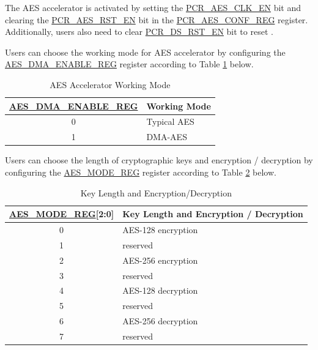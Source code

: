 \documentclass[main\_\_EN.tex]{subfiles}
\begin{document}
The AES accelerator is activated by setting the \hyperref[fielddesc:PCRAESCLKEN]{PCR\_AES\_CLK\_EN} bit and clearing the \hyperref[fielddesc:PCRAESRSTEN]{PCR\_AES\_RST\_EN} bit in the \hyperref[regdesc:PCRAESCONFREG]{PCR\_AES\_CONF\_REG} register. Additionally, users also need to clear \hyperref[fielddesc:PCRDSRSTEN]{PCR\_DS\_RST\_EN} bit to reset . 

Users can choose the working mode for AES accelerator by configuring the \hyperref[regdesc:AESDMAENABLEREG]{AES\_DMA\_ENABLE\_REG} register according to Table \ref{tab:aes-dma-enable} below.

\begin{longtable}[c]{ | c | l | }
\caption{AES Accelerator Working Mode}
    \label{tab:aes-dma-enable}
    \\\hline 
    \rowcolor{lightgray}
\textbf{\hyperref[regdesc:AESDMAENABLEREG]{AES\_DMA\_ENABLE\_REG}}      & \textbf{Working Mode}\\
        \hline
        0                       & Typical AES    \\
        \hline
        1                       & DMA-AES        \\
        \hline
\end{longtable}

Users can choose the length of cryptographic keys and encryption / decryption by configuring the \hyperref[regdesc:AESMODEREG]{AES\_MODE\_REG} register according to Table \ref{tab:aes-operation} below.

\begin{longtable}[c]{ | c | l | }
\caption{Key Length and Encryption/Decryption}
\label{tab:aes-operation}
\\\hline 
\rowcolor{lightgray}
\textbf{\hyperref[regdesc:AESMODEREG]{AES\_MODE\_REG}[2:0] }    & \textbf{Key Length and Encryption / Decryption}\\
    \hline
    0                   & AES-128 encryption    \\
    \hline
    1                   & reserved    \\
    \hline
    2                   & AES-256 encryption    \\
    \hline
    3                   & reserved    \\
    \hline
    4                   & AES-128 decryption    \\
    \hline
    5                   & reserved    \\
    \hline
    6                   & AES-256 decryption    \\
    \hline
    7                   & reserved    \\
    \hline
\end{longtable}
\end{document}
